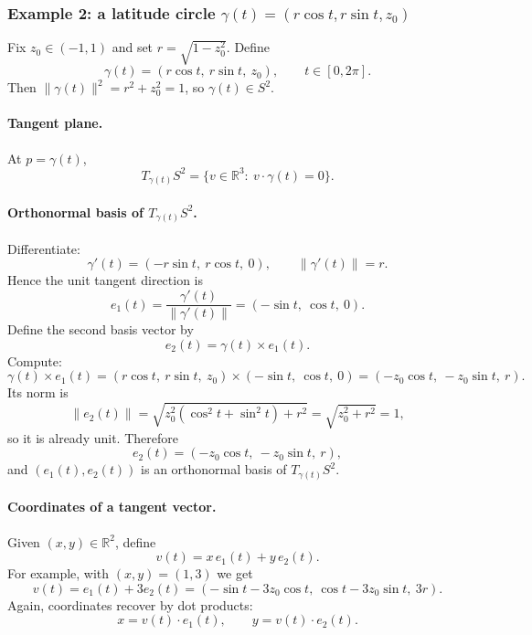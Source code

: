 \documentclass[12pt,a4paper]{article}
\theoremstyle{plain}
\theoremstyle{definition}      %
\begin{document}
	\subsubsection*{Example 2: a latitude circle $\gamma(t)=(r\cos t,r\sin t,z_0)$}
	
	Fix $z_0\in(-1,1)$ and set $r=\sqrt{1-z_0^2}$. Define
	\[
	\gamma(t)=(r\cos t,\ r\sin t,\ z_0),\qquad t\in[0,2\pi].
	\]
	Then $\|\gamma(t)\|^2=r^2+z_0^2=1$, so $\gamma(t)\in S^2$.
	
	\paragraph{Tangent plane.}
	At $p=\gamma(t)$,
	\[
	T_{\gamma(t)}S^2=\{v\in\mathbb{R}^3:\ v\cdot \gamma(t)=0\}.
	\]
	
	\paragraph{Orthonormal basis of $T_{\gamma(t)}S^2$.}
	Differentiate:
	\[
	\gamma'(t)=(-r\sin t,\ r\cos t,\ 0),\qquad \|\gamma'(t)\|=r.
	\]
	Hence the unit tangent direction is
	\[
	e_1(t)=\frac{\gamma'(t)}{\|\gamma'(t)\|}=(-\sin t,\ \cos t,\ 0).
	\]
	Define the second basis vector by
	\[
	e_2(t)=\gamma(t)\times e_1(t).
	\]
	Compute:
	\[
	\gamma(t)\times e_1(t)
	=(r\cos t,\ r\sin t,\ z_0)\times(-\sin t,\ \cos t,\ 0)
	=(-z_0\cos t,\ -z_0\sin t,\ r).
	\]
	Its norm is
	\[
	\|e_2(t)\|=\sqrt{z_0^2(\cos^2 t+\sin^2 t)+r^2}=\sqrt{z_0^2+r^2}=1,
	\]
	so it is already unit. Therefore
	\[
	e_2(t)=(-z_0\cos t,\ -z_0\sin t,\ r),
	\]
	and $(e_1(t),e_2(t))$ is an orthonormal basis of $T_{\gamma(t)}S^2$.
	
	\paragraph{Coordinates of a tangent vector.}
	Given $(x,y)\in\mathbb{R}^2$, define
	\[
	v(t)=x\,e_1(t)+y\,e_2(t).
	\]
	For example, with $(x,y)=(1,3)$ we get
	\[
	v(t)=e_1(t)+3e_2(t)
	=(-\sin t-3z_0\cos t,\ \cos t-3z_0\sin t,\ 3r).
	\]
	Again, coordinates recover by dot products:
	\[
	x=v(t)\cdot e_1(t),\qquad y=v(t)\cdot e_2(t).
	\]
	
	
\end{document}
